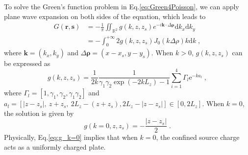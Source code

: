\documentclass[aps,prl,reprint,showpacs,floatfix,superscriptaddress]{revtex4-2}
\newcommand{\V}[1]{\boldsymbol{#1}} %
\newcommand{\abs}[1]{\left|#1\right|} %
\begin{document}
To solve the Green's function problem in Eq.\eqref{eq:Green4Poisson}, we can apply plane wave expansion on both sides of the equation, which leads to 
\begin{equation}\label{eq:G_point_charge}
    \begin{split}
        G(\V{r},\V{s}) & = - \frac{1}{\pi} \iint_{\mathbb{R}^2} g(k, z, z_s) e^{-i \V{k} \cdot \Delta \V{\rho}} \text{d} k_x \text{d} k_y \\
        & = - \int_{0}^{+\infty} 2 g(k, z, z_s) J_0(k \Delta \rho) k \text{d}k\;,
    \end{split}
\end{equation}
where $\V{k} = (k_x, k_y)$ and $\Delta \V{\rho} = (x - x_s, y - y_s)$.
When $k>0$, $g(k, z, z_s)$ can be expressed as 
\begin{equation}\label{eq:g_solution}
    g(k, z, z_s) = \frac{1}{2k} \frac{1}{\gamma_1 \gamma_2 \exp{(-2 k L_z)} - 1} \sum_{i = 1}^{4} \Gamma_l \text{e}^{-k a_l}\;,
\end{equation}
where $\Gamma_l = \left[1,\gamma_1,\gamma_2,\gamma_1 \gamma_2 \right]$ and $a_l = [\abs{z - z_s},~z + z_s,~2L_z - (z + z_s),2L_z - \abs{z - z_s}] \in [0, 2L_z]$.
When $k=0$, the solution is given by 
\begin{equation}\label{eq:g_k=0}
    g(k = 0, z, z_s) = - \frac{\abs{z - z_s}}{2}\;.
\end{equation}
Physically, Eq.\eqref{eq:g_k=0} implies that when $k=0$, the confined source charge acts as a uniformly charged plate.
\end{document}
